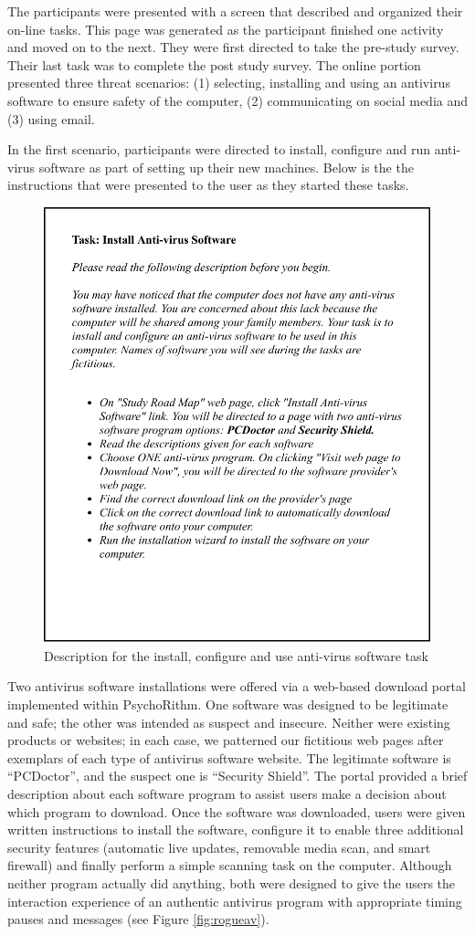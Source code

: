 \vspace{1em}
The participants were presented with a screen that described and organized their on-line tasks. This page was generated as the participant finished one activity and moved on to the next. They were first directed to take the pre-study survey. Their last task was to complete the post study survey. The online portion presented three threat scenarios: (1) selecting, installing and using an antivirus software to ensure safety of the computer, (2) communicating on social media and (3) using email.

In the first scenario, participants were directed to install, configure and run anti-virus software as part of setting up their new machines. Below is the the instructions that were presented to the user as they started these tasks.

\begin{figure}[tpb]
  \centering
  \includegraphics[width=0.7\columnwidth]{img/task.pdf}
  \caption{Description for the install, configure and use anti-virus software task}
  \label{fig:Task}
\end{figure}

Two antivirus software installations were offered via a web-based download portal implemented within PsychoRithm. One software was designed to be legitimate and safe; the other was intended as suspect and insecure. Neither were existing products or websites; in each case, we patterned our fictitious web pages after exemplars of each type of antivirus software website.  The legitimate software is ``PCDoctor'', and the suspect one is ``Security Shield''. The portal provided a brief description about each software program to assist users make a decision about which program to download. Once the software was downloaded, users were given written instructions to install the software, configure it to enable three additional security features (automatic live updates, removable media scan, and smart firewall) and finally perform a simple scanning task on the computer. Although neither program actually did anything, both were designed to give the users the interaction experience of an authentic antivirus program with appropriate timing pauses and messages (see Figure \ref{fig:rogueav}).  

